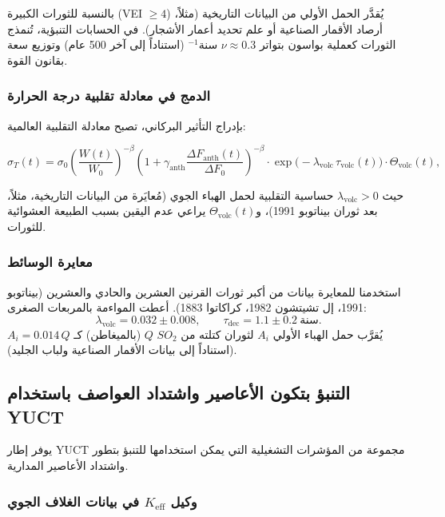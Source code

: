 \documentclass[11pt,a4paper]{article}
\begin{document}
	بالنسبة للثورات الكبيرة (VEI \(\ge 4\)) يُقدَّر الحمل الأولي من البيانات التاريخية (مثلاً، أرصاد الأقمار الصناعية أو علم تحديد أعمار الأشجار). في الحسابات التنبؤية، تُنمذج الثورات كعملية بواسون بتواتر \(\nu \approx 0.3\) سنة\(^{-1}\) (استناداً إلى آخر 500 عام) وتوزيع سعة بقانون القوة.
	
	\subsubsection{الدمج في معادلة تقلبية درجة الحرارة}
	
	بإدراج التأثير البركاني، تصبح معادلة التقلبية العالمية:
	
	\[
	\sigma_T(t) = \sigma_0 \left( \frac{W(t)}{W_0} \right)^{-\beta}
	\left(1 + \gamma_{\text{anth}} \frac{\Delta F_{\text{anth}}(t)}{\Delta F_0}\right)^{-\beta}
	\cdot \exp\!\bigl(-\lambda_{\text{volc}} \,\tau_{\text{volc}}(t)\bigr) \cdot \Theta_{\text{volc}}(t),
	\]
	
	حيث \(\lambda_{\text{volc}} > 0\) حساسية التقلبية لحمل الهباء الجوي (مُعايَرة من البيانات التاريخية، مثلاً، بعد ثوران بيناتوبو 1991)، و\(\Theta_{\text{volc}}(t)\) يراعي عدم اليقين بسبب الطبيعة العشوائية للثورات.
	
	\subsubsection{معايرة الوسائط}
	
	استخدمنا للمعايرة بيانات من أكبر ثورات القرنين العشرين والحادي والعشرين (بيناتوبو 1991، إل تشيتشون 1982، كراكاتوا 1883). أعطت المواءمة بالمربعات الصغرى:
	\[
	\lambda_{\text{volc}} = 0.032 \pm 0.008, \qquad \tau_{\text{dec}} = 1.1 \pm 0.2\ \text{سنة}.
	\]
	يُقرَّب حمل الهباء الأولي \(A_i\) لثوران كتلته من \(SO_2\) \(Q\) (بالميغاطن) كـ \(A_i = 0.014\,Q\) (استناداً إلى بيانات الأقمار الصناعية ولباب الجليد).
	
	\subsection{التنبؤ بتكون الأعاصير واشتداد العواصف باستخدام YUCT}
	\label{subsec:cyclone_prediction}
	
	يوفر إطار YUCT مجموعة من المؤشرات التشغيلية التي يمكن استخدامها للتنبؤ بتطور واشتداد الأعاصير المدارية.
	
	\subsubsection*{وكيل \(K_{\mathrm{eff}}\) في بيانات الغلاف الجوي}
	
\end{document}
